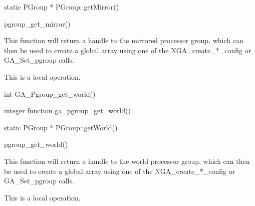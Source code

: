 \documentclass[12pt]{article}
\begin{document}
\begin{cxxapi}
\begin{cxxcode}
static PGroup * PGroup::getMirror()
\end{cxxcode}
\end{cxxapi}

\begin{pyapi}
\begin{pycode}
pgroup_get_mirror() 
\end{pycode}
\end{pyapi} 


\begin{desc}

This function will return a handle to the mirrored processor group, which can then be used to create a global array using one of the NGA_create_*_config or GA_Set_pgroup calls.

This is a local operation. 
\end{desc}


\begin{capi}
\begin{ccode}
int GA_Pgroup_get_world()
\end{ccode}
\end{capi}

\begin{fapi}
\begin{fcode}
integer function ga_pgroup_get_world()
\end{fcode}
\end{fapi}

\begin{cxxapi}
\begin{cxxcode}
static PGroup * PGroup::getWorld()
\end{cxxcode}
\end{cxxapi}

\begin{pyapi}
\begin{pycode}
pgroup_get_world() 
\end{pycode}
\end{pyapi} 


\begin{desc}

This function will return a handle to the world processor group, which can then be used to create a global array using one of the NGA_create_*_config or GA_Set_pgroup calls.

This is a local operation.
\end{desc}
\end{document}
